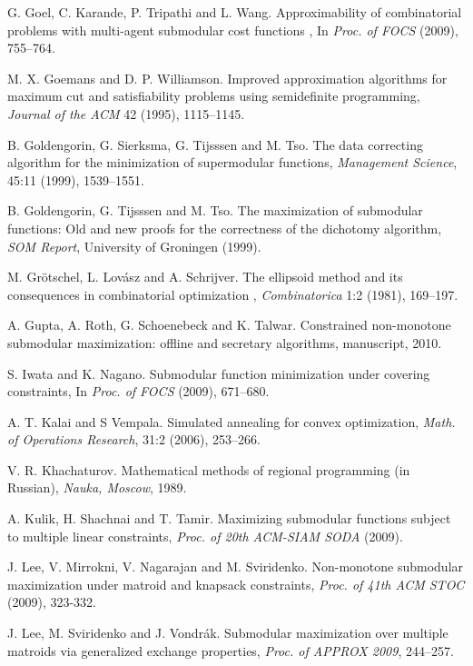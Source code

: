 \documentclass{article}[11pt]
\begin{document}
\begin{thebibliography}{99}
 G. Goel, C. Karande, P. Tripathi and L. Wang.
Approximability of combinatorial problems with multi-agent submodular cost functions ,
In {\em Proc. of  FOCS} (2009), 755--764.

 M. X. Goemans and D. P. Williamson.
Improved approximation algorithms for maximum cut and satisfiability problems
using semidefinite programming, {\em Journal of the ACM} 42 (1995), 1115--1145.

 B. Goldengorin, G. Sierksma, G. Tijsssen and M. Tso.
The data correcting algorithm for the minimization of supermodular functions,
{\em Management Science}, 45:11 (1999), 1539--1551.

 B. Goldengorin, G. Tijsssen and M. Tso.
The maximization of submodular functions: Old and new proofs for the
correctness of the dichotomy algorithm, {\em SOM Report},
University of Groningen (1999).

 M. Gr\"{o}tschel, L. Lov\'asz and A. Schrijver.
The ellipsoid method and its consequences in combinatorial optimization ,
{\em Combinatorica} 1:2 (1981), 169--197.

 A. Gupta, A. Roth, G. Schoenebeck and K. Talwar.
Constrained non-monotone submodular maximization: offline and secretary algorithms,
manuscript, 2010.

 S. Iwata and K. Nagano.
Submodular function minimization under covering constraints,
In {\em Proc. of  FOCS} (2009), 671--680.

 A. T. Kalai and S Vempala.
Simulated annealing for convex optimization,
{\em Math. of Operations Research}, 31:2 (2006), 253--266.

 V. R. Khachaturov.
Mathematical methods of regional programming (in Russian),
{\em Nauka, Moscow}, 1989.

 A. Kulik, H. Shachnai and T. Tamir.
Maximizing submodular functions subject to multiple linear constraints,
\emph{Proc. of 20th ACM-SIAM SODA} (2009).

 J. Lee, V. Mirrokni, V. Nagarajan and M. Sviridenko.
Non-monotone submodular maximization under matroid and knapsack constraints,
 \emph{Proc. of 41th ACM STOC} (2009), 323-332.

 J. Lee, M. Sviridenko and J. Vondr\'ak.
Submodular maximization over multiple matroids via generalized exchange properties,
{\em Proc. of APPROX 2009}, 244--257.


\end{thebibliography}
\end{document}
